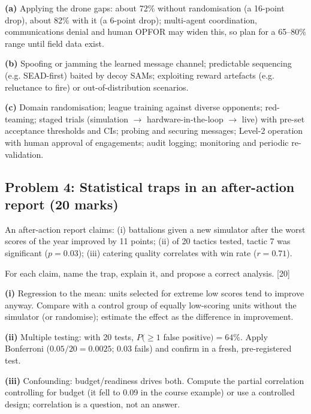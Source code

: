 \documentclass[11pt]{article}
\begin{document}
\begin{soln}\textbf{(a)} Applying the drone gaps: about 72\% without randomisation (a 16-point drop), about 82\% with it (a 6-point drop); multi-agent coordination, communications denial and human OPFOR may widen this, so plan for a 65--80\% range until field data exist.

\textbf{(b)} Spoofing or jamming the learned message channel; predictable sequencing (e.g. SEAD-first) baited by decoy SAMs; exploiting reward artefacts (e.g. reluctance to fire) or out-of-distribution scenarios.

\textbf{(c)} Domain randomisation; league training against diverse opponents; red-teaming; staged trials (simulation $\rightarrow$ hardware-in-the-loop $\rightarrow$ live) with pre-set acceptance thresholds and CIs; probing and securing messages; Level-2 operation with human approval of engagements; audit logging; monitoring and periodic re-validation.\end{soln}

\subsection{Problem 4: Statistical traps in an after-action report \normalfont\small\color{GreyN}(20 marks)}

\begin{prob}An after-action report claims: (i) battalions given a new simulator after the worst scores of the year improved by 11 points; (ii) of 20 tactics tested, tactic 7 was significant ($p=0.03$); (iii) catering quality correlates with win rate ($r=0.71$).

For each claim, name the trap, explain it, and propose a correct analysis. [20]\end{prob}

\begin{soln}\textbf{(i)} Regression to the mean: units selected for extreme low scores tend to improve anyway. Compare with a control group of equally low-scoring units without the simulator (or randomise); estimate the effect as the difference in improvement.

\textbf{(ii)} Multiple testing: with 20 tests, $P(\ge1$ false positive$)=64\%$. Apply Bonferroni ($0.05/20=0.0025$; 0.03 fails) and confirm in a fresh, pre-registered test.

\textbf{(iii)} Confounding: budget/readiness drives both. Compute the partial correlation controlling for budget (it fell to 0.09 in the course example) or use a controlled design; correlation is a question, not an answer.\end{soln}
\end{document}
